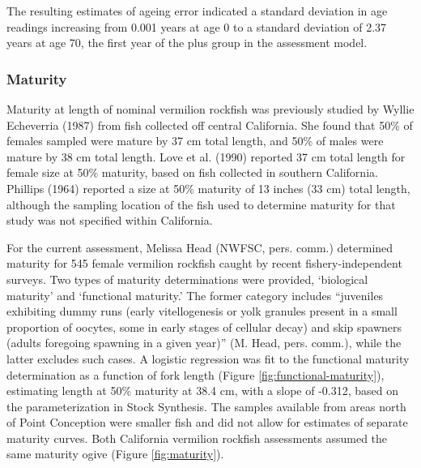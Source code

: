\documentclass[11pt,
  english,
]{article}
\begin{document}
The resulting estimates of ageing error indicated a standard deviation in age readings increasing from 0.001 years at age 0 to a standard deviation of 2.37 years at age 70, the first year of the plus group in the assessment model.


\hypertarget{maturity}{%
\subsubsection{Maturity}\label{maturity}}

\leavevmode\tagmcend\tagstructend

Maturity at length of nominal vermilion rockfish was previously studied by Wyllie Echeverria {(1987)\leavevmode\tagmcend\tagstructend} from fish collected off central California. She found that 50\% of females sampled were mature by 37 cm total length, and 50\% of males were mature by 38 cm total length. Love et al. {(1990)\leavevmode\tagmcend\tagstructend} reported 37 cm total length for female size at 50\% maturity, based on fish collected in southern California. Phillips {(1964)\leavevmode\tagmcend\tagstructend} reported a size at 50\% maturity of 13 inches (33 cm) total length, although the sampling location of the fish used to determine maturity for that study was not specified within California.

For the current assessment, Melissa Head (NWFSC, pers. comm.) determined maturity for 545 female vermilion rockfish caught by recent fishery-independent surveys. Two types of maturity determinations were provided, `biological maturity' and `functional maturity.' The former category includes ``juveniles exhibiting dummy runs (early vitellogenesis or yolk granules present in a small proportion of oocytes, some in early stages of cellular decay) and skip spawners (adults foregoing spawning in a given year)'' (M. Head, pers. comm.), while the latter excludes such cases. A logistic regression was fit to the functional maturity determination as a function of fork length (Figure \ref{fig:functional-maturity}), estimating length at 50\% maturity at 38.4 cm, with a slope of -0.312, based on the parameterization in Stock Synthesis. The samples available from areas north of Point Conception were smaller fish and did not allow for estimates of separate maturity curves. Both California vermilion rockfish assessments assumed the same maturity ogive (Figure \ref{fig:maturity}).
\end{document}
